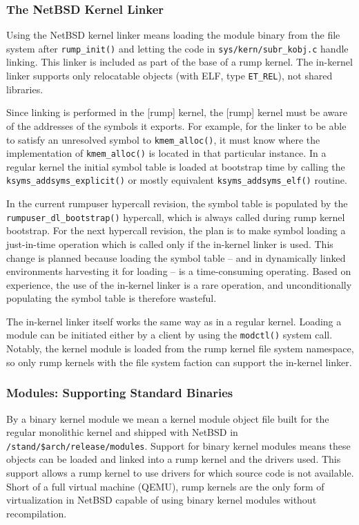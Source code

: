 \subsubsection*{The NetBSD Kernel Linker}

Using the NetBSD kernel linker means loading the module binary from the
file system after \verb+rump_init()+ and letting the code in
\verb+sys/kern/subr_kobj.c+ handle linking.  This linker is included
as part of the base of a rump kernel.  The in-kernel linker supports
only relocatable objects (with ELF, type \verb+ET_REL+), not shared
libraries.

Since linking is performed in the [rump] kernel, the [rump] kernel
must be aware of the addresses of the symbols it exports.  For
example, for the linker to be able to satisfy an unresolved symbol
to \verb+kmem_alloc()+, it must know where the implementation of
\verb+kmem_alloc()+ is located in that particular instance.  In a
regular kernel the initial symbol table is loaded at bootstrap time
by calling the \verb+ksyms_addsyms_explicit()+ or mostly equivalent
\verb+ksyms_addsyms_elf()+ routine.

In the current rumpuser hypercall revision, the symbol table is populated
by the
\verb+rumpuser_dl_bootstrap()+ hypercall, which is always called during
rump kernel bootstrap.  For the next hypercall revision, the plan is to
make symbol loading a just-in-time operation which is called only if
the in-kernel linker is used.  This change is planned because loading
the symbol table -- and in dynamically linked environments harvesting
it for loading -- is a time-consuming operating.  Based on experience,
the use of the in-kernel linker is a rare operation, and unconditionally
populating the symbol table is therefore wasteful.

The in-kernel linker itself works the same way as in a regular kernel.
Loading a module can be initiated either by a client by using the
\texttt{modctl()} system call.  Notably, the kernel module is loaded
from the rump kernel file system namespace, so only rump kernels with
the file system faction can support the in-kernel linker.


\subsubsection{Modules: Supporting Standard Binaries}
\label{sect:abicompat}

By a binary kernel module we mean a kernel module object file
built for the regular monolithic kernel and shipped with NetBSD in
\verb+/stand/$arch/release/modules+.  Support for binary kernel
modules means these objects can be loaded and linked into a rump
kernel and the drivers used.  This support allows a
rump kernel to use drivers for which source code is not
available.  Short of a full virtual machine (\eg QEMU), rump kernels
are the only form of virtualization in NetBSD capable of using
binary kernel modules without recompilation.

